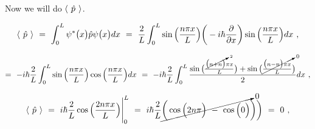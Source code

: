 \documentclass{article}
\begin{document}
Now we will do \begin{math} \langle\hspace{0.125cm} \hat{p} \hspace{0.125cm} \rangle \end{math}.

\begin{equation} \label{eb-eq-249-1}
\langle \hspace{0.125cm} \hat{p} \hspace{0.125cm} \rangle \hspace{0.125cm} = \hspace{0.125cm} \int_{0}^{L} \psi^{\ast}\big(x\big) \hat{p} \psi\big(x\big) dx \hspace{0.125cm} = \hspace{0.125cm} \frac{2}{L} \int_{0}^{L} \sin\Big(\frac{n\pi x}{L}\Big) \bigg( -i\hbar \frac{\partial}{\partial{x}} \bigg) \sin\Big(\frac{n\pi x}{L}\Big) dx \hspace{0.125cm} , 
\end{equation}

\begin{equation} \label{eb-eq-250-1}
= \hspace{0.125cm} -i\hbar \frac{2}{L} \int_{0}^{L} \sin\Big(\frac{n\pi x}{L}\Big)\cos\Big(\frac{n\pi x}{L}\Big) dx  \hspace{0.125cm} = \hspace{0.125cm} -i\hbar \frac{2}{L} \int_{0}^{L} \frac{\sin\big(\frac{\cancelto{2}{\big(n + n\big)}\pi x}{L} \big) + \sin\big(\cancelto{0}{\frac{\big(n - n\big)\pi x}{L}} \big)}{2} dx \hspace{0.125cm} , 
\end{equation}

\begin{equation} \label{eb-eq-251-1}
\langle \hspace{0.125cm} \hat{p} \hspace{0.125cm} \rangle \hspace{0.125cm} = \hspace{0.125cm} i\hbar \frac{2}{L} \cos\Big(\frac{2n\pi x}{L}\Big) \Bigg|_{0}^{L} \hspace{0.125cm} = \hspace{0.125cm} i\hbar  \frac{2}{L} \cancelto{0}{\bigg( \cos\Big( 2n\pi \Big) \hspace{0.125cm} - \hspace{0.125cm} \cos\Big( 0 \Big)} \bigg) \bigg) \hspace{0.125cm} = \hspace{0.125cm} 0 \hspace{0.125cm} , 
\end{equation}
\end{document}
